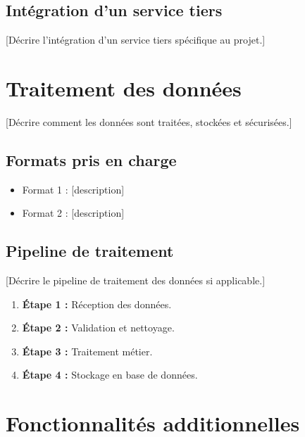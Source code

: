 \documentclass[12pt, a4paper]{article}
\begin{document}
\subsection{Intégration d'un service tiers}

[Décrire l'intégration d'un service tiers spécifique au projet.]

\section{Traitement des données}

[Décrire comment les données sont traitées, stockées et sécurisées.]

\subsection{Formats pris en charge}

\begin{itemize}
  \item Format 1 : [description]
  \item Format 2 : [description]
\end{itemize}

\subsection{Pipeline de traitement}

[Décrire le pipeline de traitement des données si applicable.]

\begin{enumerate}
  \item \textbf{Étape 1 :} Réception des données.
  \item \textbf{Étape 2 :} Validation et nettoyage.
  \item \textbf{Étape 3 :} Traitement métier.
  \item \textbf{Étape 4 :} Stockage en base de données.
\end{enumerate}

\section{Fonctionnalités additionnelles}
\end{document}
